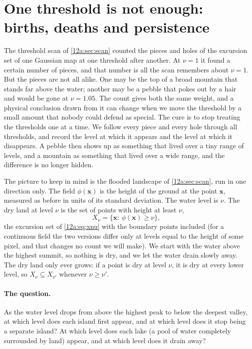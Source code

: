\section{One threshold is not enough: births, deaths and persistence}
\label{12b:sec:filtration}

The threshold scan of \cref{12a:sec:scan} counted the pieces and holes of the excursion set of one Gaussian map
at one threshold after another. At $\nu=1$ it found a certain number of pieces, and that number is all the
scan remembers about $\nu=1$. But the pieces are not all alike. One may be the top of a broad mountain that
stands far above the water; another may be a pebble that pokes out by a hair and would be gone at $\nu=1.05$.
The count gives both the same weight, and a physical conclusion drawn from it can change when we move the
threshold by a small amount that nobody could defend as special. The cure is to stop treating the thresholds
one at a time. We follow every piece and every hole through all thresholds, and record the level at which it
appears and the level at which it disappears. A pebble then shows up as something that lived over a tiny range
of levels, and a mountain as something that lived over a wide range, and the difference is no longer hidden.

The picture to keep in mind is the flooded landscape of \cref{12a:sec:scan}, run in one direction only. The
field $\phi(\bm x)$ is the height of the ground at the point $\bm x$, measured as before in units of its
standard deviation. The water level is $\nu$. The dry land at level $\nu$ is the set of points with height at
least $\nu$,
\begin{equation}
  X_\nu=\{\bm x:\ \phi(\bm x)\geq\nu\},
  \label{12b:eq:superlevel}
\end{equation}
the excursion set of \cref{12a:eq:xnu} with the boundary points included (for a continuous field the two
versions differ only at levels equal to the height of some pixel, and that changes no count we will make). We
start with the water above the highest summit, so nothing is dry, and we let the water drain slowly away.
The dry land only ever grows: if a point is dry at level $\nu$, it is dry at every lower level, so
$X_{\nu}\subseteq X_{\nu'}$ whenever $\nu\geq\nu'$.

\paragraph{The question.} As the water level drops from above the highest peak to below the deepest valley,
at which level does each island first appear, and at which level does it stop being a separate island? At
which level does each lake (a pool of water completely surrounded by land) appear, and at which level does it
drain away?

